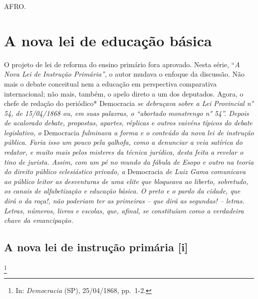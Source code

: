 AFRO.

\part{A nova lei de educação básica}

\begin{didascalia}
O projeto de lei de reforma do ensino primário fora aprovado. Nesta
série, ``\emph{A Nova Lei de Instrução Primária''}, o autor mudava o
enfoque da discussão. Não mais o debate conceitual nem a educação em
perspectiva comparativa internacional; não mais, também, o apelo direto
a um dos deputados. Agora, o chefe de redação do periódico* Democracia
\emph{se debruçava sobre a Lei Provincial n° 54, de 15/04/1868 ou, em
suas palavras, o ``abortado monstrengo n° 54''. Depois de acalorado
debate, propostas, apartes, réplicas e outros vaivéns típicos do debate
legislativo, o} Democracia \emph{fulminava a forma e o conteúdo da nova
lei de instrução pública. Faria isso um pouco pela galhofa, como a
denunciar a veia satírica do redator, e muito mais pelos misteres da
técnica jurídica, desta feita a revelar o tino de jurista. Assim, com um
pé no mundo da fábula de Esopo e outro na teoria do direito público
eclesiástico privado, a} Democracia \emph{de Luiz Gama comunicava ao
público leitor as desventuras de uma elite que bloqueava ao liberto,
sobretudo, os canais de alfabetização e educação básica. O preto e o
pardo da cidade, que dirá o da roça!, não poderiam ter as primeiras --
que dirá as segundas! -- letras. Letras, números, livros e escolas, que,
afinal, se constituíam como a verdadeira chave da emancipação.}
\end{didascalia}

\chapter{A nova lei de instrução primária {[}i{]}}\footnote{In:
  \emph{Democracia} (SP), 25/04/1868, pp.~1-2.}

